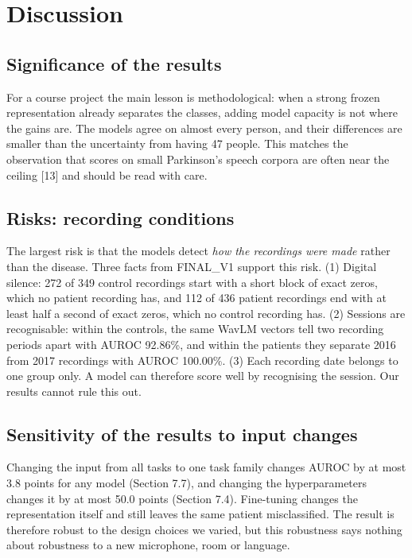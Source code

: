 \documentclass[11pt,a4paper]{article}
\begin{document}
\section{Discussion}\label{sec:discussion}
\subsection{Significance of the results}\label{sec:significance}
For a course project the main lesson is methodological: when a strong frozen representation already separates the classes, adding model capacity is not where the gains are. The models agree on almost every person, and their differences are smaller than the uncertainty from having 47 people. This matches the observation that scores on small Parkinson's speech corpora are often near the ceiling [13] and should be read with care.

\subsection{Risks: recording conditions}\label{sec:risks}
The largest risk is that the models detect \emph{how the recordings were made} rather than the disease. Three facts from FINAL\_V1 support this risk. (1) Digital silence: 272 of 349 control recordings start with a short block of exact zeros, which no patient recording has, and 112 of 436 patient recordings end with at least half a second of exact zeros, which no control recording has. (2) Sessions are recognisable: within the controls, the same WavLM vectors tell two recording periods apart with AUROC 92.86\%, and within the patients they separate 2016 from 2017 recordings with AUROC 100.00\%. (3) Each recording date belongs to one group only. A model can therefore score well by recognising the session. Our results cannot rule this out.

\subsection{Sensitivity of the results to input changes}\label{sec:inputsens}
Changing the input from all tasks to one task family changes AUROC by at most 3.8 points for any model (Section 7.7), and changing the hyperparameters changes it by at most 50.0 points (Section 7.4). Fine-tuning changes the representation itself and still leaves the same patient misclassified. The result is therefore robust to the design choices we varied, but this robustness says nothing about robustness to a new microphone, room or language.
\end{document}
